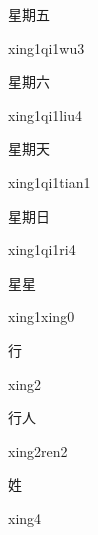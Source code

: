 \begin{verbete}[xing1qi1wu3]{星期五}
\begin{pronuncia}{xing1qi1wu3}
\end{pronuncia}
\end{verbete}

\begin{verbete}{星期六}
\begin{pronuncia}{xing1qi1liu4}
\end{pronuncia}
\end{verbete}

\begin{verbete}{星期天}
\begin{pronuncia}{xing1qi1tian1}
\end{pronuncia}
\end{verbete}

\begin{verbete}[xing1qi1ri4]{星期日}
\begin{pronuncia}{xing1qi1ri4}
\end{pronuncia}
\end{verbete}

\begin{verbete}{星星}
\begin{pronuncia}{xing1xing0}
\end{pronuncia}
\end{verbete}

\begin{verbete}[xing2]{行}
\begin{pronuncia}{xing2}
\end{pronuncia}
\end{verbete}

\begin{verbete}{行人}
\begin{pronuncia}{xing2ren2}
\end{pronuncia}
\end{verbete}

\begin{verbete}[xing4]{姓}
\begin{pronuncia}{xing4}
\end{pronuncia}
\end{verbete}

